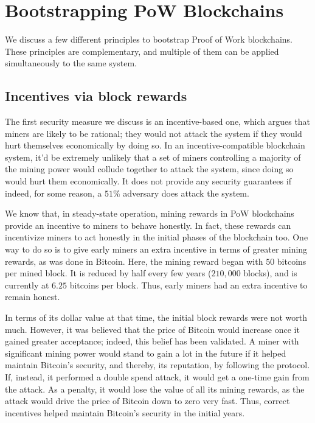 \documentclass{article}
\begin{document}
\section*{Bootstrapping PoW Blockchains}
We discuss a few different principles to bootstrap Proof of Work blockchains. These principles are complementary, and multiple of them can be applied simultaneously to the same system.

\subsection*{Incentives via block rewards}
The first security measure we discuss is an incentive-based one, which argues that miners are likely to be rational; they would not attack the system if they would hurt themselves economically by doing so. In an incentive-compatible blockchain system, it'd be extremely unlikely that a set of miners controlling a majority of the mining power would collude together to attack the system, since doing so would hurt them economically. It does not provide any security guarantees if indeed, for some reason, a $51\%$ adversary does attack the system.

We know that, in steady-state operation, mining rewards in PoW blockchains provide an incentive to miners to behave honestly. In fact, these rewards can incentivize miners to act honestly in the initial phases of the blockchain too. One way to do so is to give early miners an extra incentive in terms of greater mining rewards, as was done in Bitcoin. Here, the mining reward began with $50$ bitcoins per mined block. It is reduced by half every few years ($210,000$ blocks), and is currently at $6.25$ bitcoins per block. Thus, early miners had an extra incentive to remain honest.

In terms of its dollar value at that time, the initial block rewards were not worth much. However, it was believed that the price of Bitcoin would increase once it gained greater acceptance; indeed, this belief has been validated. A miner with significant mining power would stand to gain a lot in the future if it helped maintain Bitcoin's security, and thereby, its reputation, by following the protocol. If, instead, it performed a double spend attack, it would get a one-time gain from the attack. As a penalty, it would lose the value of all its mining rewards, as the attack would drive the price of Bitcoin down to zero very fast. Thus, correct incentives helped maintain Bitcoin's security in the initial years.
\end{document}
